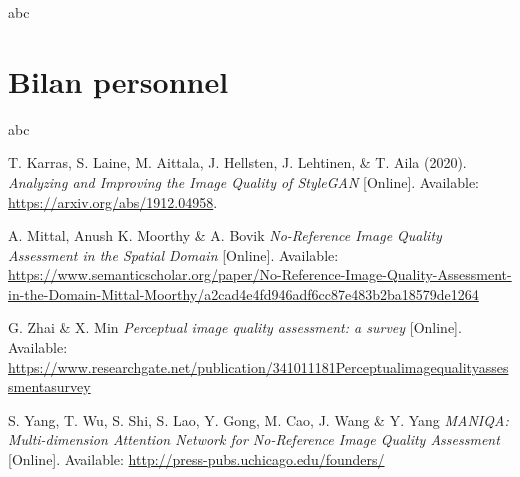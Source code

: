 \documentclass{ieeeaccess}
\begin{document}
abc

\section{Bilan personnel}

abc

\begin{thebibliography}{00}

T. Karras, S. Laine, M. Aittala, J. Hellsten, J. Lehtinen, \& T. Aila (2020).
\emph{Analyzing and Improving the Image Quality of StyleGAN} [Online].
\newline
Available:
\underline{https://arxiv.org/abs/1912.04958}.

A. Mittal, Anush K. Moorthy \& A. Bovik
\emph{No-Reference Image Quality Assessment in the Spatial Domain} [Online].
\newline
Available:
\underline{https://www.semanticscholar.org/paper/No-Reference-Image-Quality-Assessment-in-the-Domain-Mittal-Moorthy/a2cad4e4fd946adf6cc87e483b2ba18579de1264}

G. Zhai \& X. Min
\emph{Perceptual image quality assessment: a survey} [Online].
\newline
Available:
\underline{https://www.researchgate.net/publication/341011181\textunderscore Perceptual\textunderscore image\textunderscore quality\textunderscore assessment\textunderscore a\textunderscore survey}

S. Yang, T. Wu, S. Shi, S. Lao, Y. Gong, M. Cao, J. Wang \& Y. Yang
\emph{MANIQA: Multi-dimension Attention Network for No-Reference Image Quality Assessment} [Online].
\newline
Available:
\underline{http://press-pubs.uchicago.edu/founders/}

\end{thebibliography}

\EOD
\end{document}
